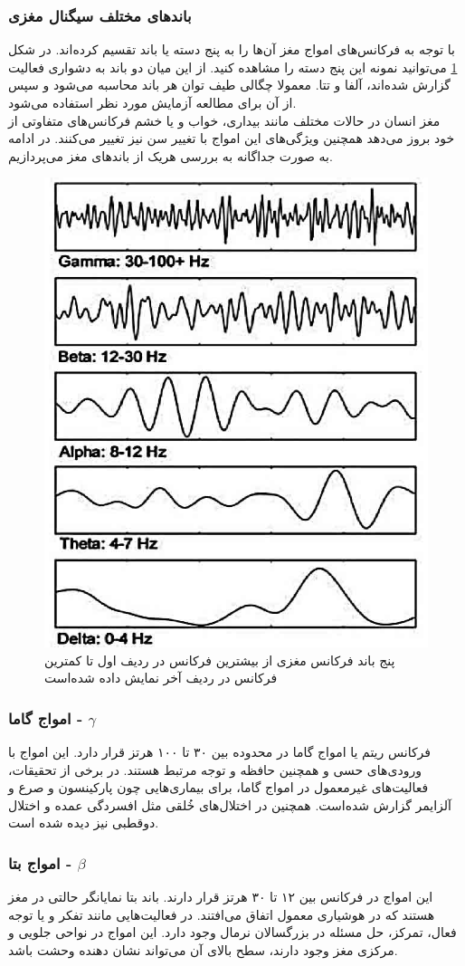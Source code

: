 \subsubsection{باندهای مختلف سیگنال مغزی}
با توجه به فرکانس‌های امواج مغز آن‌ها را به پنج دسته یا باند تقسیم کرده‌اند. در شکل
\ref{fig:this-frequency-bands-of-eeg-signal}
می‌توانید نمونه این پنج دسته را مشاهده کنید. از این میان دو باند به دشواری فعالیت گزارش شده‌اند، آلفا و تتا. معمولا چگالی طیف توان
 هر باند محاسبه می‌شود و سپس از آن برای مطالعه آزمایش مورد نظر استفاده می‌شود.
 \\
 مغز انسان در حالات مختلف مانند بیداری، خواب و یا خشم فرکانس‌های متفاوتی از خود بروز می‌دهد همچنین ویژگی‌های این امواج با تغییر سن نیز تغییر می‌کنند. 
 در ادامه به صورت جداگانه به بررسی هریک از باند‌های مغز می‌پردازیم.
\begin{figure}[htbp]
	\centering
	\includegraphics[width=0.5\linewidth]{figures/This-Frequency-bands-of-EEG-signal}
	\caption[باندهای امواج مغزی]{پنج باند فرکانس مغزی از بیشترین فرکانس در ردیف اول تا کمترین فرکانس در ردیف آخر نمایش داده شده‌است}
	\label{fig:this-frequency-bands-of-eeg-signal}
\end{figure}

\subsubsection*{امواج گاما - $ \gamma $}
فرکانس ریتم یا امواج گاما در محدوده بین ۳۰ تا ۱۰۰ هرتز قرار دارد. این امواج با ورودی‌های حسی و همچنین حافظه و توجه مرتبط هستند.
در برخی از تحقیقات، فعالیت‌های غیرمعمول در امواج گاما، برای بیماری‌هایی چون پارکینسون و صرع و آلزایمر گزارش شده‌است. همچنین در اختلال‌های خُلقی مثل افسردگی عمده و اختلال دوقطبی نیز دیده شده است.
\subsubsection*{امواج بتا - $ \beta $}
این امواج در فرکانس بین ۱۲ تا ۳۰ هرتز قرار دارند. باند بتا نمایانگر حالتی در مغز هستند که در هوشیاری معمول اتفاق می‌افتند. در فعالیت‌هایی مانند تفکر و یا توجه فعال، تمرکز، حل مسئله در بزرگسالان نرمال وجود دارد. این امواج در نواحی جلویی و مرکزی مغز وجود دارند، سطح بالای آن می‌تواند نشان دهنده وحشت باشد.
